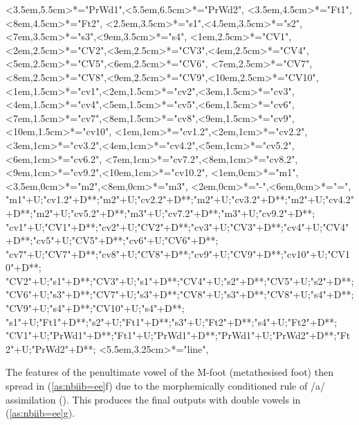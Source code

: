 \begin{multicols}{2}
\begin{exe}
{\begin{xlist}
{		<3.5em,5.5cm>*="PrWd1",<5.5em,6.5cm>*="PrWd2",
		<3.5em,4.5cm>*="Ft1",<8em,4.5cm>*="Ft2",
		<2.5em,3.5cm>*="s1",<4.5em,3.5cm>*="s2",<7em,3.5cm>*="s3",<9em,3.5cm>*="s4",
		<1em,2.5cm>*="CV1",<2em,2.5cm>*="CV2",<3em,2.5cm>*="CV3",<4em,2.5cm>*="CV4",<5em,2.5cm>*="CV5",<6em,2.5cm>*="CV6",
		<7em,2.5cm>*="CV7",<8em,2.5cm>*="CV8",<9em,2.5cm>*="CV9",<10em,2.5cm>*="CV10",
		<1em,1.5cm>*="cv1",<2em,1.5cm>*="cv2",<3em,1.5cm>*="cv3",<4em,1.5cm>*="cv4",<5em,1.5cm>*="cv5",<6em,1.5cm>*\as{\0}="cv6",
		<7em,1.5cm>*="cv7",<8em,1.5cm>*\as{ }="cv8",<9em,1.5cm>*="cv9",<10em,1.5cm>*\as{ }="cv10",
		<1em,1cm>*="cv1.2",<2em,1cm>*="cv2.2",<3em,1cm>*="cv3.2",<4em,1cm>*="cv4.2",<5em,1cm>*="cv5.2",<6em,1cm>*\as{\0}="cv6.2",
		<7em,1cm>*="cv7.2",<8em,1cm>*\as{ }="cv8.2",<9em,1cm>*="cv9.2",<10em,1cm>*\as{ }="cv10.2",
		<1em,0cm>*="m1",<3.5em,0cm>*="m2",<8em,0cm>*="m3",
		<2em,0cm>*\as{-}="-",<6em,0cm>*\as{=}="=",
		"m1"+U;"cv1.2"+D**\dir{-};"m2"+U;"cv2.2"+D**\dir{-};"m2"+U;"cv3.2"+D**\dir{-};"m2"+U;"cv4.2"+D**\dir{-};"m2"+U;"cv5.2"+D**\dir{-};"m3"+U;"cv7.2"+D**\dir{-};"m3"+U;"cv9.2"+D**\dir{-};
		"cv1"+U;"CV1"+D**\dir{-};"cv2"+U;"CV2"+D**\dir{-};"cv3"+U;"CV3"+D**\dir{-};"cv4"+U;"CV4"+D**\dir{-};"cv5"+U;"CV5"+D**\dir{-};"cv6"+U;"CV6"+D**\dir{-};
		"cv7"+U;"CV7"+D**\dir{-};"cv8"+U;"CV8"+D**\dir{};"cv9"+U;"CV9"+D**\dir{-};"cv10"+U;"CV10"+D**\dir{};
		"CV2"+U;"s1"+D**\dir{-};"CV3"+U;"s1"+D**\dir{-};"CV4"+U;"s2"+D**\dir{-};"CV5"+U;"s2"+D**\dir{-};
		"CV6"+U;"s3"+D**\dir{-};"CV7"+U;"s3"+D**\dir{-};"CV8"+U;"s3"+D**\dir{-};"CV8"+U;"s4"+D**\dir{-};"CV9"+U;"s4"+D**\dir{-};"CV10"+U;"s4"+D**\dir{-};
		"s1"+U;"Ft1"+D**\dir{-};"s2"+U;"Ft1"+D**\dir{-};"s3"+U;"Ft2"+D**\dir{-};"s4"+U;"Ft2"+D**\dir{-};
		"CV1"+U;"PrWd1"+D**\dir{-};"Ft1"+U;"PrWd1"+D**\dir{-};"PrWd1"+U;"PrWd2"+D**\dir{-};"Ft2"+U;"PrWd2"+D**\dir{-};
		<5.5em,3.25cm>*="line",
	\endxy}
	\end{xlist}}
\end{exe}
\end{multicols}

The features of the penultimate vowel of the M-foot (metathesised foot)
then spread in (\ref{as:nbiib=ee}f) due to the morphemically
conditioned rule of /a/ assimilation ().
This produces the final outputs with double vowels in (\ref{as:nbiib=ee}g).

